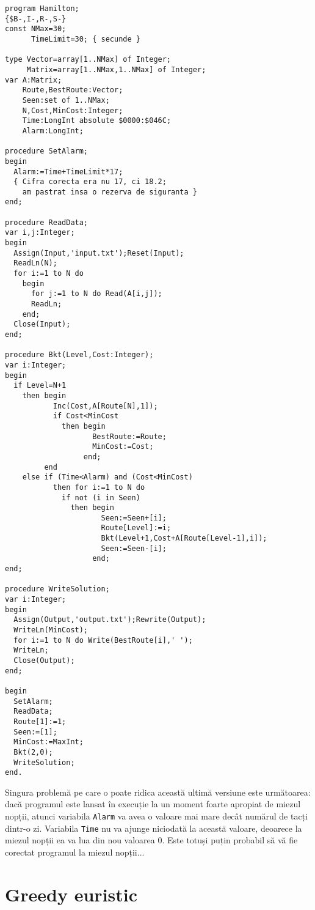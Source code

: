 \begin{verbatim}
program Hamilton;
{$B-,I-,R-,S-}
const NMax=30;
      TimeLimit=30; { secunde }

type Vector=array[1..NMax] of Integer;
     Matrix=array[1..NMax,1..NMax] of Integer;
var A:Matrix;
    Route,BestRoute:Vector;
    Seen:set of 1..NMax;
    N,Cost,MinCost:Integer;
    Time:LongInt absolute $0000:$046C;
    Alarm:LongInt;

procedure SetAlarm;
begin
  Alarm:=Time+TimeLimit*17;
  { Cifra corecta era nu 17, ci 18.2;
    am pastrat insa o rezerva de siguranta }
end;

procedure ReadData;
var i,j:Integer;
begin
  Assign(Input,'input.txt');Reset(Input);
  ReadLn(N);
  for i:=1 to N do
    begin
      for j:=1 to N do Read(A[i,j]);
      ReadLn;
    end;
  Close(Input);
end;

procedure Bkt(Level,Cost:Integer);
var i:Integer;
begin
  if Level=N+1
    then begin
           Inc(Cost,A[Route[N],1]);
           if Cost<MinCost
             then begin
                    BestRoute:=Route;
                    MinCost:=Cost;
                  end;
         end
    else if (Time<Alarm) and (Cost<MinCost)
           then for i:=1 to N do
             if not (i in Seen)
               then begin
                      Seen:=Seen+[i];
                      Route[Level]:=i;
                      Bkt(Level+1,Cost+A[Route[Level-1],i]);
                      Seen:=Seen-[i];
                    end;
end;

procedure WriteSolution;
var i:Integer;
begin
  Assign(Output,'output.txt');Rewrite(Output);
  WriteLn(MinCost);
  for i:=1 to N do Write(BestRoute[i],' ');
  WriteLn;
  Close(Output);
end;

begin
  SetAlarm;
  ReadData;
  Route[1]:=1;
  Seen:=[1];
  MinCost:=MaxInt;
  Bkt(2,0);
  WriteSolution;
end.
\end{verbatim}

Singura problemă pe care o poate ridica această ultimă versiune este
următoarea: dacă programul este lansat în execuție la un moment foarte
apropiat de miezul nopții, atunci variabila {\tt Alarm} va avea o valoare mai
mare decât numărul de tacți dintr-o zi. Variabila {\tt Time} nu va ajunge
niciodată la această valoare, deoarece la miezul nopții ea va lua din nou
valoarea 0. Este totuși puțin probabil să vă fie corectat programul la miezul
nopții...

\section{Greedy euristic}

